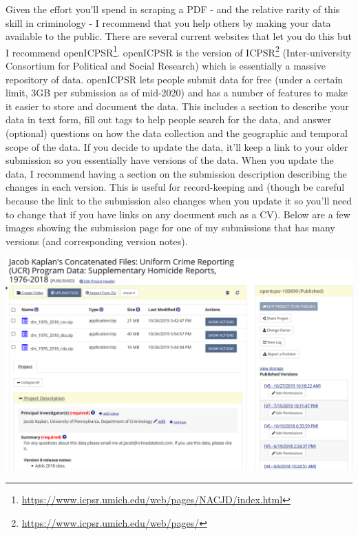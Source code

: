\documentclass[
]{krantz}
\renewcommand{\href}[2]{#2\footnote{\url{#1}}}
\begin{document}
Given the effort you'll spend in scraping a PDF - and the relative rarity of this skill in criminology - I recommend that you help others by making your data available to the public. There are several current websites that let you do this but I recommend \href{https://www.icpsr.umich.edu/web/pages/NACJD/index.html}{openICPSR}. openICPSR is the version of \href{https://www.icpsr.umich.edu/web/pages/}{ICPSR} (Inter-university Consortium for Political and Social Research) which is essentially a massive repository of data. openICPSR lets people submit data for free (under a certain limit, 3GB per submission as of mid-2020) and has a number of features to make it easier to store and document the data. This includes a section to describe your data in text form, fill out tags to help people search for the data, and answer (optional) questions on how the data collection and the geographic and temporal scope of the data. If you decide to update the data, it'll keep a link to your older submission so you essentially have versions of the data. When you update the data, I recommend having a section on the submission description describing the changes in each version. This is useful for record-keeping and (though be careful because the link to the submission also changes when you update it so you'll need to change that if you have links on any document such as a CV). Below are a few images showing the submission page for one of my submissions that has many versions (and corresponding version notes).

\includegraphics{images/openICPSR1.PNG}
\end{document}
